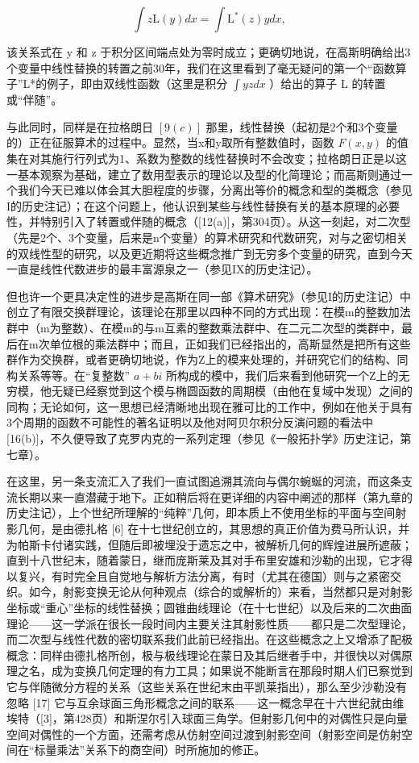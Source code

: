 \[
\int z \mathrm{L} (y) d x = \int \mathrm{L} ^ {*} (z) y d x,
\]

该关系式在 y 和 z 于积分区间端点处为零时成立；更确切地说，在高斯明确给出3个变量中线性替换的转置之前30年，我们在这里看到了毫无疑问的第一个“函数算子”L*的例子，即由双线性函数（这里是积分 \(\int yz dx\) ）给出的算子 L 的转置或“伴随”。

与此同时，同样是在拉格朗日 \([9(c)]\) 那里，线性替换（起初是2个和3个变量的）正在征服算术的过程中。显然，当x和y取所有整数值时，函数 \(F(x,y)\) 的值集在对其施行行列式为1、系数为整数的线性替换时不会改变；拉格朗日正是以这一基本观察为基础，建立了数用型表示的理论以及型的化简理论；而高斯则通过一个我们今天已难以体会其大胆程度的步骤，分离出等价的概念和型的类概念（参见I的历史注记）；在这个问题上，他认识到某些与线性替换有关的基本原理的必要性，并特别引入了转置或伴随的概念（{[}12(a){]}，第304页）。从这一刻起，对二次型（先是2个、3个变量，后来是n个变量）的算术研究和代数研究，对与之密切相关的双线性型的研究，以及更近期将这些概念推广到无穷多个变量的研究，直到今天一直是线性代数进步的最丰富源泉之一（参见IX的历史注记）。

但也许一个更具决定性的进步是高斯在同一部《算术研究》（参见I的历史注记）中创立了有限交换群理论，该理论在那里以四种不同的方式出现：在模m的整数加法群中（m为整数）、在模m的与m互素的整数乘法群中、在二元二次型的类群中，最后在m次单位根的乘法群中；而且，正如我们已经指出的，高斯显然是把所有这些群作为交换群，或者更确切地说，作为Z上的模来处理的，并研究它们的结构、同构关系等等。在“复整数” \(a + bi\) 所构成的模中，我们后来看到他研究一个Z上的无穷模，他无疑已经察觉到这个模与椭圆函数的周期模（由他在复域中发现）之间的同构；无论如何，这一思想已经清晰地出现在雅可比的工作中，例如在他关于具有3个周期的函数不可能性的著名证明以及他对阿贝尔积分反演问题的看法中 {[}16(b){]}，不久便导致了克罗内克的一系列定理（参见《一般拓扑学》历史注记，第七章）。

在这里，另一条支流汇入了我们一直试图追溯其流向与偶尔蜿蜒的河流，而这条支流长期以来一直潜藏于地下。正如稍后将在更详细的内容中阐述的那样（第九章的历史注记），上个世纪所理解的“纯粹”几何，即本质上不使用坐标的平面与空间射影几何，是由德扎格 {[}6{]} 在十七世纪创立的，其思想的真正价值为费马所认识，并为帕斯卡付诸实践，但随后即被埋没于遗忘之中，被解析几何的辉煌进展所遮蔽；直到十八世纪末，随着蒙日，继而庞斯莱及其对手布里安雄和沙勒的出现，它才得以复兴，有时完全且自觉地与解析方法分离，有时（尤其在德国）则与之紧密交织。如今，射影变换无论从何种观点（综合的或解析的）来看，当然都只是对射影坐标或“重心”坐标的线性替换；圆锥曲线理论（在十七世纪）以及后来的二次曲面理论——这一学派在很长一段时间内主要关注其射影性质——都只是二次型理论，而二次型与线性代数的密切联系我们此前已经指出。在这些概念之上又增添了配极概念：同样由德扎格所创，极与极线理论在蒙日及其后继者手中，并很快以对偶原理之名，成为变换几何定理的有力工具；如果说不能断言在那段时期人们已察觉到它与伴随微分方程的关系（这些关系在世纪末由平凯莱指出），那么至少沙勒没有忽略 {[}17{]} 它与互余球面三角形概念之间的联系——这一概念早在十六世纪就由维埃特（{[}3{]}，第428页）和斯涅尔引入球面三角学。但射影几何中的对偶性只是向量空间对偶性的一个方面，还需考虑从仿射空间过渡到射影空间（射影空间是仿射空间在“标量乘法”关系下的商空间）时所施加的修正。

